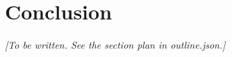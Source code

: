 \section{Conclusion}
\label{sec:conclusion}
\textit{[To be written. See the section plan in outline.json.]}
